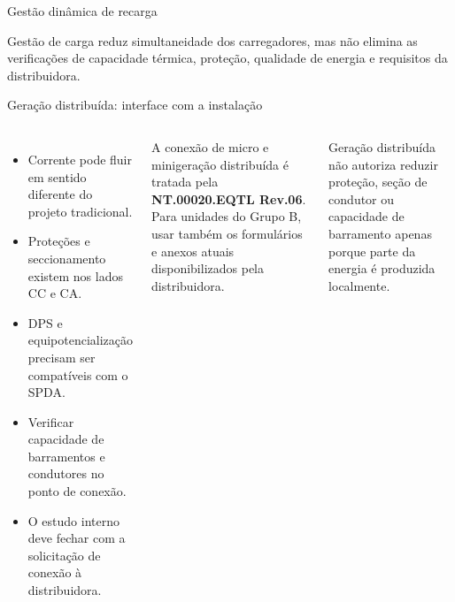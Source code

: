\begin{frame}{Gestão dinâmica de recarga}
\small
\centering
{}
\vspace{1mm}
\begin{caixaObs}
Gestão de carga reduz simultaneidade dos carregadores, mas não elimina as verificações de capacidade térmica, proteção, qualidade de energia e requisitos da distribuidora.
\end{caixaObs}
\end{frame}

\begin{frame}{Geração distribuída: interface com a instalação}
\small
\begin{columns}[T,onlytextwidth]
\begin{itemize}
\item Corrente pode fluir em sentido diferente do projeto tradicional.
\item Proteções e seccionamento existem nos lados CC e CA.
\item DPS e equipotencialização precisam ser compatíveis com o SPDA.
\item Verificar capacidade de barramentos e condutores no ponto de conexão.
\item O estudo interno deve fechar com a solicitação de conexão à distribuidora.
\end{itemize}
\begin{caixaNorma}[title=Equatorial]
A conexão de micro e minigeração distribuída é tratada pela \textbf{NT.00020.EQTL Rev.06}. Para unidades do Grupo B, usar também os formulários e anexos atuais disponibilizados pela distribuidora.
\end{caixaNorma}
\begin{caixaAt}
Geração distribuída não autoriza reduzir proteção, seção de condutor ou capacidade de barramento apenas porque parte da energia é produzida localmente.
\end{caixaAt}
\end{columns}
\end{frame}

